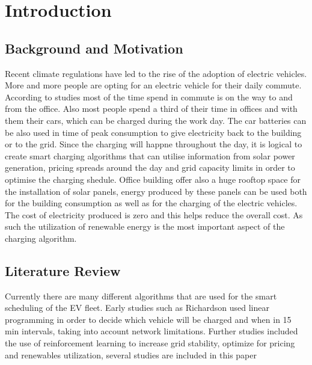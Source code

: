 \chapter{Introduction}
\label{ch:introduction}

\section{Background and Motivation}
\label{sec:background}

Recent climate regulations have led to the rise of the adoption of electric vehicles. More and more people are opting for an electric vehicle for their daily commute. According to studies most of the time spend in commute is on the way to and from the office. Also most people spend a third of their time in offices and with them their cars, 
which can be charged during the work day. The car batteries can be also used in time of peak consumption to give electricity back to the building or to the grid. Since the charging will happne throughout the day,  
it is logical to create smart charging algorithms that can utilise information from solar power generation, pricing spreads around the day and grid capacity limits in order to optimise the charging shedule. Office building offer also a huge rooftop space for the installation of solar panels, 
energy produced by these panels can be used both for the building consumption as well as for the charging of the electric vehicles. The cost of electricity produced is zero and this helps reduce the overall cost. As such the utilization of renewable energy is the most important aspect of the charging algorithm. 

\section{Literature Review}
\label{sec:literature_review}

Currently there are many different algorithms that are used for the smart scheduling of the EV fleet. Early studies such as Richardson \cite{richardson2012ev_ucd} used linear programming in order to decide which vehicle will be charged and when in 15 min intervals,
taking into account network limitations. Further studies included the use of reinforcement learning to increase grid stability, optimize for pricing and renewables utilization, several studies are included in this paper \cite{qiu2023rl_ev_review}

